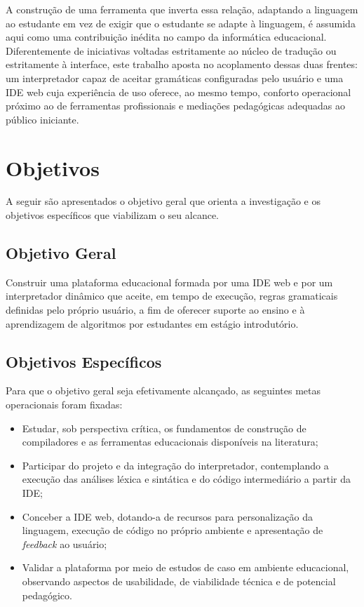 A construção de uma ferramenta que inverta essa relação, adaptando a linguagem ao estudante em vez de exigir que o estudante se adapte à linguagem, é assumida aqui como uma contribuição inédita no campo da informática educacional. Diferentemente de iniciativas voltadas estritamente ao núcleo de tradução ou estritamente à interface, este trabalho aposta no acoplamento dessas duas frentes: um interpretador capaz de aceitar gramáticas configuradas pelo usuário e uma IDE web cuja experiência de uso oferece, ao mesmo tempo, conforto operacional próximo ao de ferramentas profissionais e mediações pedagógicas adequadas ao público iniciante.

\section{Objetivos}

A seguir são apresentados o objetivo geral que orienta a investigação e os objetivos específicos que viabilizam o seu alcance.

\subsection{Objetivo Geral}

Construir uma plataforma educacional formada por uma IDE web e por um interpretador dinâmico que aceite, em tempo de execução, regras gramaticais definidas pelo próprio usuário, a fim de oferecer suporte ao ensino e à aprendizagem de algoritmos por estudantes em estágio introdutório.

\subsection{Objetivos Específicos}

Para que o objetivo geral seja efetivamente alcançado, as seguintes metas operacionais foram fixadas:

\begin{itemize}
    \item Estudar, sob perspectiva crítica, os fundamentos de construção de compiladores e as ferramentas educacionais disponíveis na literatura;
    \item Participar do projeto e da integração do interpretador, contemplando a execução das análises léxica e sintática e do código intermediário a partir da IDE;
    \item Conceber a IDE web, dotando-a de recursos para personalização da linguagem, execução de código no próprio ambiente e apresentação de \textit{feedback} ao usuário;
    \item Validar a plataforma por meio de estudos de caso em ambiente educacional, observando aspectos de usabilidade, de viabilidade técnica e de potencial pedagógico.
\end{itemize}


